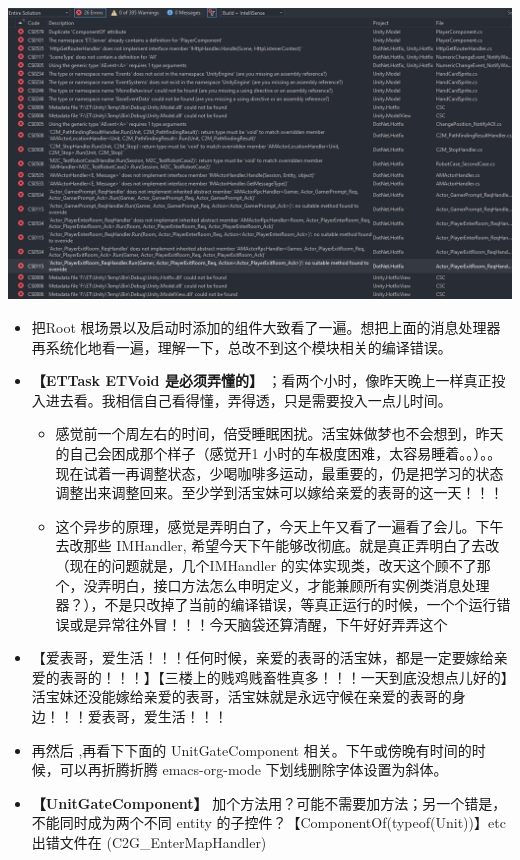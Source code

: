 \documentclass[9pt, b5paper]{article}
\begin{document}
\includegraphics[width=.9\linewidth]{./pic/et4_20230604_162732.png}
\begin{itemize}
\item 把Root 根场景以及启动时添加的组件大致看了一遍。想把上面的消息处理器再系统化地看一遍，理解一下，总改不到这个模块相关的编译错误。
\item \textbf{【ETTask ETVoid 是必须弄懂的】} ；看两个小时，像昨天晚上一样真正投入进去看。我相信自己看得懂，弄得透，只是需要投入一点儿时间。
\begin{itemize}
\item 感觉前一个周左右的时间，倍受睡眠困扰。活宝妹做梦也不会想到，昨天的自己会困成那个样子（感觉开1 小时的车极度困难，太容易睡着。。）。。现在试着一再调整状态，少喝咖啡多运动，最重要的，仍是把学习的状态调整出来调整回来。至少学到活宝妹可以嫁给亲爱的表哥的这一天！！！
\item 这个异步的原理，感觉是弄明白了，今天上午又看了一遍看了会儿。下午去改那些 IMHandler, 希望今天下午能够改彻底。就是真正弄明白了去改（现在的问题就是，几个IMHandler 的实体实现类，改天这个顾不了那个，没弄明白，接口方法怎么申明定义，才能兼顾所有实例类消息处理器？），不是只改掉了当前的编译错误，等真正运行的时候，一个个运行错误或是异常往外冒！！！今天脑袋还算清醒，下午好好弄弄这个
\end{itemize}
\item 【爱表哥，爱生活！！！任何时候，亲爱的表哥的活宝妹，都是一定要嫁给亲爱的表哥的！！！】【三楼上的贱鸡贱畜牲真多！！！一天到底没想点儿好的】活宝妹还没能嫁给亲爱的表哥，活宝妹就是永远守候在亲爱的表哥的身边！！！爱表哥，爱生活！！！
\item 再然后 ,再看下下面的 UnitGateComponent 相关。下午或傍晚有时间的时候，可以再折腾折腾 emacs-org-mode 下划线删除字体设置为斜体。
\item \textbf{【UnitGateComponent】} 加个方法用？可能不需要加方法；另一个错是，不能同时成为两个不同 entity 的子控件？【ComponentOf(typeof(Unit))】etc 出错文件在 (C2G\_EnterMapHandler)

\end{itemize}
\end{document}
